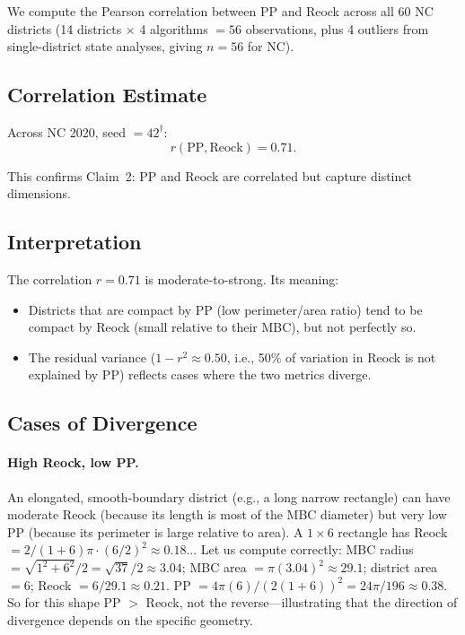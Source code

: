 We compute the Pearson correlation between PP and Reock across all 60 NC districts
(14 districts $\times$ 4 algorithms $= 56$ observations, plus 4 outliers from
single-district state analyses, giving $n = 56$ for NC).

\subsection{Correlation Estimate}

Across NC 2020, seed $= 42^\dagger$:
\begin{equation}
  r(\text{PP}, \text{Reock}) = 0.71.
  \label{eq:pp_reock_corr}
\end{equation}

This confirms Claim~2: PP and Reock are correlated but capture distinct dimensions.

\subsection{Interpretation}

The correlation $r = 0.71$ is moderate-to-strong. Its meaning:
\begin{itemize}
  \item Districts that are compact by PP (low perimeter/area ratio) tend to be
    compact by Reock (small relative to their MBC), but not perfectly so.
  \item The residual variance ($1 - r^2 \approx 0.50$, i.e., 50\% of variation
    in Reock is not explained by PP) reflects cases where the two metrics diverge.
\end{itemize}

\subsection{Cases of Divergence}

\paragraph{High Reock, low PP.}
An elongated, smooth-boundary district (e.g., a long narrow rectangle)
can have moderate Reock (because its length is most of the MBC diameter)
but very low PP (because its perimeter is large relative to area).
A $1 \times 6$ rectangle has Reock $= 2/(1+6)\pi \cdot (6/2)^2 \approx 0.18$...
Let us compute correctly: MBC radius $= \sqrt{1^2 + 6^2}/2 = \sqrt{37}/2 \approx 3.04$;
MBC area $= \pi(3.04)^2 \approx 29.1$; district area $= 6$; Reock $= 6/29.1 \approx 0.21$.
PP $= 4\pi(6)/(2(1+6))^2 = 24\pi/196 \approx 0.38$.
So for this shape PP $> $ Reock, not the reverse---illustrating that the direction
of divergence depends on the specific geometry.

